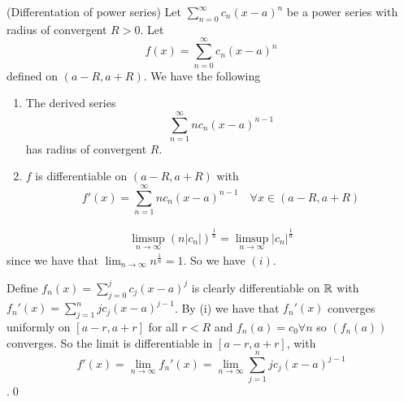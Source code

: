 \documentclass{article}
\begin{document}
\begin{theorem}
	(Differentation of power series) Let $ \sum_{n=0}^\infty c_n(x-a)^n $ be a power series with radius of convergent $ R>0 $. Let
	\[
		f(x)=\sum_{n=0}^\infty c_n(x-a)^n
	\]
	defined on $ (a-R,a+R) $. We have the following
	\begin{enumerate}
		\item The derived series \[
		  \sum_{n=1}^\infty nc_n(x-a)^{n-1}
	  \]
	  has radius of convergent $ R $.
  \item $ f $ is differentiable on $ (a-R,a+R) $ with
	  \[
		  f'(x)=\sum_{n=1}^\infty nc_n(x-a)^{n-1}\quad\forall x\in(a-R,a+R)
	  \]
	\end{enumerate}
\end{theorem}
\pf
\begin{align*}
	\limsup_{n\to\infty}(n|c_n|)^{\frac 1n}=\limsup_{n\to\infty}|c_n|^{\frac 1n}
\end{align*}
since we have that $ \lim_{n\to\infty}n^{\frac 1n} = 1$. So we have $ (i) $.\par
Define $ f_n(x)=\sum_{j=0}^jc_j(x-a)^j $ is clearly differentiable on $ \mathbb{R} $ with $ f_n'(x)=\sum_{j=1}^njc_j(x-a)^{j-1} $. By (i) we have that $ f_n'(x) $ converges uniformly on $ [a-r,a+r] $ for all $ r<R $ and $ f_n(a)=c_0 \forall n $ so $ (f_n(a)) $ converges. So the limit is differentiable in $ [a-r,a+r] $, with \[ f'(x)=\lim_{n\to\infty}f_n'(x) =\lim_{n\to\infty}\sum_{j=1}^njc_j(x-a)^{j-1}\].\qed
\end{document}
